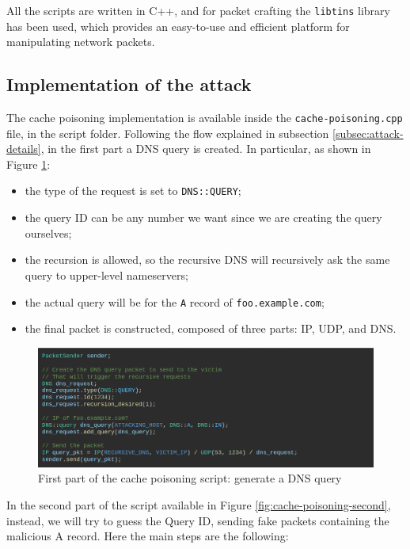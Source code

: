 \documentclass[11pt,a4paper]{article}
\begin{document}
\noindent
All the scripts are written in C++, and for packet crafting the \texttt{libtins}
library has been used, which provides an easy-to-use and efficient platform for
manipulating network packets.

\subsection{Implementation of the attack}
The cache poisoning implementation is available inside the \texttt{cache-poisoning.cpp}
file, in the script folder. Following the flow explained in subsection
\ref{subsec:attack-details}, in the first part a DNS query is created. In particular,
as shown in Figure \ref{fig:cache-poisoning-first}:
\begin{itemize}
    \item the type of the request is set to \texttt{DNS::QUERY};
    \item the query ID can be any number we want since we are creating the query ourselves;
    \item the recursion is allowed, so the recursive DNS will recursively ask the same query to upper-level nameservers;
    \item the actual query will be for the \texttt{A} record of \texttt{foo.example.com};
    \item the final packet is constructed, composed of three parts: IP, UDP, and DNS.
\end{itemize}

\begin{figure}[h]
    \centering
    \includegraphics[width=\textwidth]{cache-poisoning-first.png}
    \caption{First part of the cache poisoning script: generate a DNS query}
    \label{fig:cache-poisoning-first}
\end{figure}

\noindent
In the second part of the script available in Figure \ref{fig:cache-poisoning-second},
instead, we will try to guess the Query ID, sending fake packets containing the
malicious A record. Here the main steps are the following:
\end{document}
